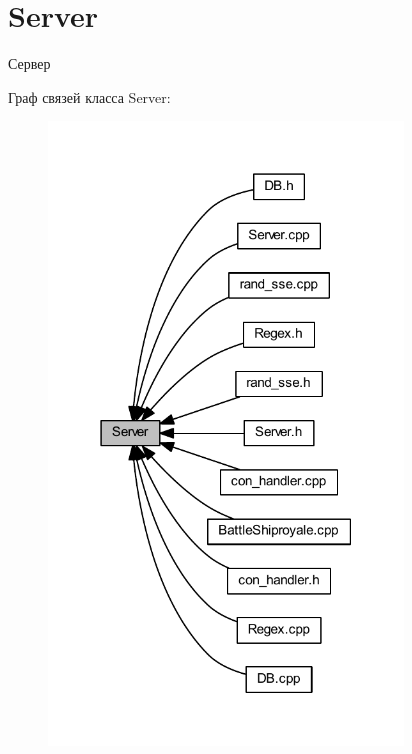 \hypertarget{group__server}{}\section{Server}
\label{group__server}


Сервер  


Граф связей класса Server\+:
\nopagebreak
\begin{figure}[H]
\begin{center}
\leavevmode
\includegraphics[width=267pt]{group__server}
\end{center}
\end{figure}
